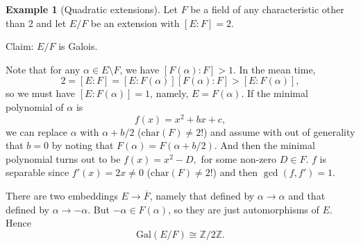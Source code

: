 \documentclass[12pt]{report}
\theoremstyle{definition}
\newtheorem{example}[thm]{Example}
\def\ZZ{\mathbb{Z}}
\def\aa{\alpha}
\def\Gal{\text{Gal}}
\def\char{\text{char}}
\begin{document}
\begin{example}[Quadratic extensions]
    Let $F$ be a field of any characteristic other than 2 and let $E/F$ be an extension with $[E:F]=2$.

    Claim: $E/F$ is Galois.

    Note that for any $\aa\in E\setminus F$, we have $[F(\aa):F] > 1$. In the mean time, $$2 = [E:F]=[E:F(\aa)][F(\aa):F] > [E:F(\aa)],$$ so we must have $[E:F(\aa)]=1$, namely, $E=F(\aa)$. If the minimal polynomial of $\aa$ is $$f(x)=x^2+bx+c,$$ we can replace $\aa$ with $\aa+b/2$ ($\char(F)\not=2$!) and assume with out of generality that $b=0$ by noting that $F(\aa)=F(\aa+b/2)$. And then the minimal polynomial turns out to be $f(x)=x^2-D,$ for some non-zero $D\in F$. $f$ is separable since $f'(x)=2x\not=0$ ($\char(F)\not=2$!) and then $\gcd(f,f')=1$.

    There are two embeddings $E\to \overline{F}$, namely that defined by $\aa\to\aa$ and that defined by $\aa\to -\aa$. But $-\aa\in F(\aa)$, so they are just automorphisms of $E$. Hence $$\Gal(E/F)\cong \ZZ/2\ZZ.$$
\end{example}
\end{document}
